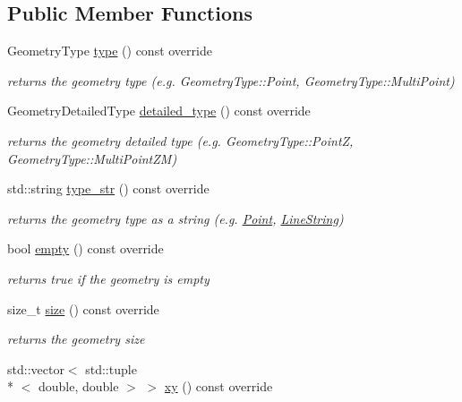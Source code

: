 \subsection*{Public Member Functions}
\begin{DoxyCompactItemize}
\item 
Geometry\-Type \hyperlink{classsimo_1_1shapes_1_1_basic_geometry_a8cb2eba04f6fb0cb80cd9c9d2c85f213}{type} () const override
\begin{DoxyCompactList}\small\item\em returns the geometry type (e.\-g. Geometry\-Type\-::\-Point, Geometry\-Type\-::\-Multi\-Point) \end{DoxyCompactList}\item 
Geometry\-Detailed\-Type \hyperlink{classsimo_1_1shapes_1_1_basic_geometry_a82ea146df5c632a15864fc56817d6d0f}{detailed\-\_\-type} () const override
\begin{DoxyCompactList}\small\item\em returns the geometry detailed type (e.\-g. Geometry\-Type\-::\-Point\-Z, Geometry\-Type\-::\-Multi\-Point\-Z\-M) \end{DoxyCompactList}\item 
std\-::string \hyperlink{classsimo_1_1shapes_1_1_basic_geometry_ad2331ba481d41c9f7089787a32ef4ced}{type\-\_\-str} () const override
\begin{DoxyCompactList}\small\item\em returns the geometry type as a string (e.\-g. \hyperlink{classsimo_1_1shapes_1_1_point}{Point}, \hyperlink{classsimo_1_1shapes_1_1_line_string}{Line\-String}) \end{DoxyCompactList}\item 
bool \hyperlink{classsimo_1_1shapes_1_1_basic_geometry_a6834cf02c916d416b84d66d03fa7a525}{empty} () const override
\begin{DoxyCompactList}\small\item\em returns true if the geometry is empty \end{DoxyCompactList}\item 
size\-\_\-t \hyperlink{classsimo_1_1shapes_1_1_basic_geometry_a5e68b783fac81ad8e6c38a0c86875423}{size} () const override
\begin{DoxyCompactList}\small\item\em returns the geometry size \end{DoxyCompactList}\item 
std\-::vector$<$ std\-::tuple\\*
$<$ double, double $>$ $>$ \hyperlink{classsimo_1_1shapes_1_1_basic_geometry_a492b93c475d7a059b4be04a2aafddc99}{xy} () const override

\end{DoxyCompactItemize}

